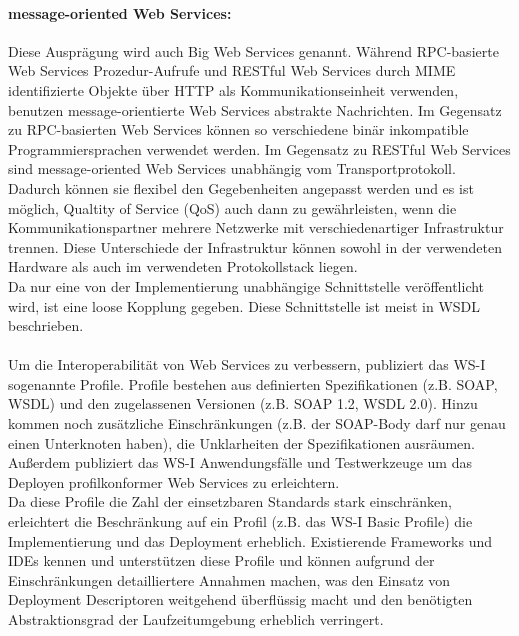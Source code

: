 \documentclass[runningheads]{llncs}
\newcommand{\germanquote}[1]{\glqq{}#1\grqq{}}
\begin{document}
    \paragraph{message-oriented Web Services:}
      Diese Ausprägung wird auch \germanquote{Big Web Services} genannt. Während RPC-basierte Web
      Services Prozedur-Aufrufe und RESTful Web Services durch MIME identifizierte Objekte über
      HTTP als Kommunikationseinheit verwenden, benutzen message-orientierte Web Services abstrakte
      Nachrichten. Im Gegensatz zu RPC-basierten Web Services können so verschiedene binär
      inkompatible Programmiersprachen verwendet werden. Im Gegensatz zu RESTful Web Services sind
      message-oriented Web Services unabhängig vom Transportprotokoll. Dadurch können sie flexibel
      den Gegebenheiten angepasst werden und es ist möglich, \germanquote{Qualtity of Service}
      (QoS) auch dann zu gewährleisten, wenn die Kommunikationspartner mehrere Netzwerke mit
      verschiedenartiger Infrastruktur trennen. Diese Unterschiede der Infrastruktur können sowohl
      in der verwendeten Hardware als auch im verwendeten Protokollstack liegen.\\
      Da nur eine von der Implementierung unabhängige Schnittstelle veröffentlicht wird, ist eine
      loose Kopplung gegeben. Diese Schnittstelle ist meist in WSDL beschrieben.

    \paragraph{}
    Um die Interoperabilität von Web Services zu verbessern, publiziert das WS-I\cite{wsi_hp}
    sogenannte Profile. Profile bestehen aus definierten Spezifikationen (z.B. SOAP, WSDL) und den
    zugelassenen Versionen (z.B. SOAP 1.2, WSDL 2.0). Hinzu kommen noch zusätzliche Einschränkungen
    (z.B. \germanquote{der SOAP-Body darf nur genau einen Unterknoten haben}), die Unklarheiten der
    Spezifikationen ausräumen. Außerdem publiziert das WS-I Anwendungsfälle und Testwerkzeuge um
    das Deployen profilkonformer Web Services zu erleichtern.\\
    Da diese Profile die Zahl der einsetzbaren Standards stark einschränken, erleichtert die
    Beschränkung auf ein Profil (z.B. das \germanquote{WS-I Basic Profile}) die Implementierung und
    das Deployment erheblich. Existierende Frameworks und IDEs kennen und unterstützen diese
    Profile und können aufgrund der Einschränkungen detailliertere Annahmen machen, was den Einsatz
    von Deployment Descriptoren weitgehend überflüssig macht und den
    benötigten Abstraktionsgrad der Laufzeitumgebung erheblich verringert.
\end{document}
